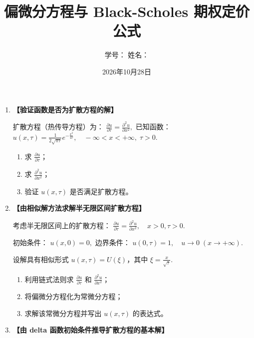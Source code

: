 \documentclass{article}
\author{学号：\underline{\hspace{4cm}} 姓名：\underline{\hspace{4cm}} }
\title{偏微分方程与 Black-Scholes 期权定价公式}
\date{2026年10月28日}
\begin{document}
\maketitle

\begin{enumerate}[label=\textbf{\arabic*.}]


\item  {\bf{【验证函数是否为扩散方程的解】}} %

扩散方程（热传导方程）为：
\(
\frac{\partial u}{\partial \tau} = \frac{\partial^2 u}{\partial x^2}, 
\)
已知函数：
\(
u(x, \tau) = \frac{1}{2\sqrt{\pi\tau}} e^{-\frac{x^2}{4\tau}}, \quad -\infty < x < +\infty, \; \tau > 0. 
\)

\begin{enumerate}[label=(\arabic*)]
    \item 求 \(\frac{\partial u}{\partial \tau}\)；
    \item 求 \(\frac{\partial^2 u}{\partial x^2}\)；
    \item 验证 \(u(x, \tau)\) 是否满足扩散方程。
\end{enumerate}



\item  {\bf{【由相似解方法求解半无限区间扩散方程】}} %

考虑半无限区间上的扩散方程：
\(
\frac{\partial u}{\partial \tau} = \frac{\partial^2 u}{\partial x^2}, \quad x > 0, \tau > 0. 
\)

初始条件：
\(
u(x, 0) = 0, 
\)
边界条件：
\(
u(0, \tau) = 1, \quad u \to 0 \; (x \to +\infty). 
\)

设解具有相似形式 \(u(x, \tau) = U(\xi)\)，其中 \(\xi = \frac{x}{\sqrt{\tau}}\). 

\begin{enumerate}[label=(\arabic*)]
    \item 利用链式法则求 \(\frac{\partial u}{\partial \tau}\) 和 \(\frac{\partial^2 u}{\partial x^2}\)；
    \item 将偏微分方程化为常微分方程；
    \item 求解该常微分方程并写出 \(u(x, \tau)\) 的表达式。
\end{enumerate}



\item  {\bf{【由 delta 函数初始条件推导扩散方程的基本解】}} %


\end{enumerate}
\end{document}
